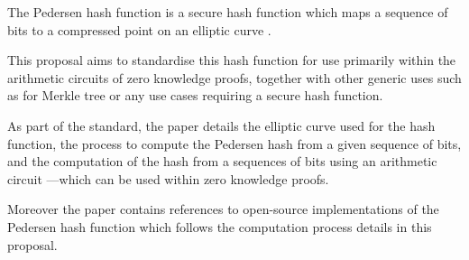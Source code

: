 The %
Pedersen hash function is a secure hash function
which maps a sequence of bits to a compressed point on an elliptic curve \cite{pedersen-gen}.

This proposal aims to standardise this hash function
for use primarily within the arithmetic circuits of zero knowledge proofs,
together with other generic uses such as for Merkle tree or any use cases requiring a secure hash function.

As part of the standard, the paper details the elliptic curve used for the hash function,
the process to compute the Pedersen hash from a given sequence of bits,
and the computation of the hash from a sequences of bits using an arithmetic circuit
---which can be used within zero knowledge proofs.

Moreover the paper contains references to open-source implementations of the %
Pedersen hash function
which follows the computation process details in this proposal.
